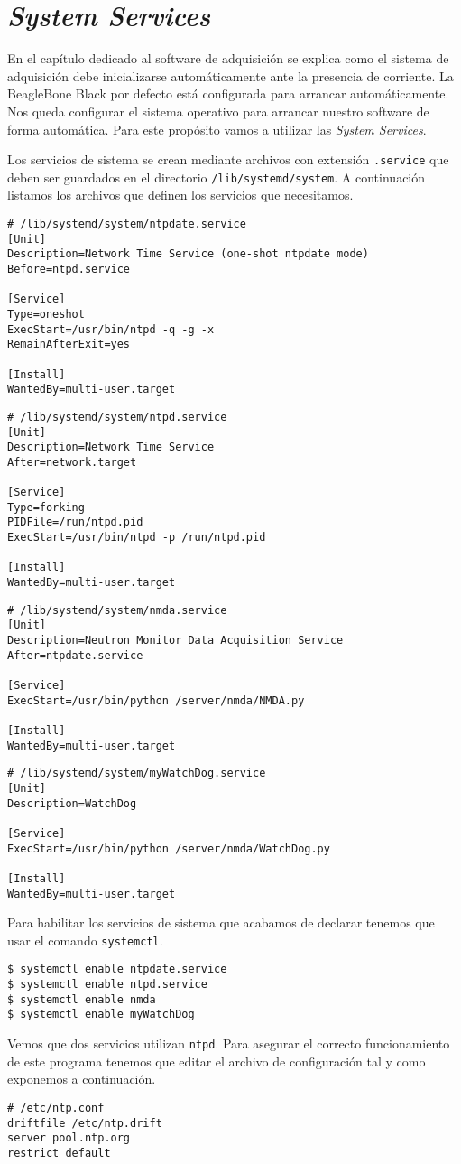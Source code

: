 	\section{\emph{System Services}}
		\label{appendix:systemctl}
		En el capítulo dedicado al software de adquisición se explica como el sistema de adquisición debe inicializarse automáticamente ante
		la presencia de corriente. La BeagleBone Black por defecto está configurada para arrancar automáticamente. Nos queda configurar el
		sistema operativo para arrancar nuestro software de forma automática. Para este propósito vamos a utilizar las \emph{System Services}. 
		\par
		Los servicios de sistema se crean mediante archivos con extensión \texttt{.service} que deben ser guardados en el directorio
		\texttt{/lib/systemd/system}. A continuación listamos los archivos que definen los servicios que necesitamos.
		\begin{lstlisting}[style=myFile]
# /lib/systemd/system/ntpdate.service
[Unit]
Description=Network Time Service (one-shot ntpdate mode)
Before=ntpd.service

[Service]
Type=oneshot
ExecStart=/usr/bin/ntpd -q -g -x
RemainAfterExit=yes

[Install]
WantedBy=multi-user.target
		\end{lstlisting}
		\begin{lstlisting}[style=myFile]
# /lib/systemd/system/ntpd.service
[Unit]
Description=Network Time Service
After=network.target

[Service]
Type=forking
PIDFile=/run/ntpd.pid
ExecStart=/usr/bin/ntpd -p /run/ntpd.pid

[Install]
WantedBy=multi-user.target
		\end{lstlisting}
		\begin{lstlisting}[style=myFile]
# /lib/systemd/system/nmda.service
[Unit]
Description=Neutron Monitor Data Acquisition Service
After=ntpdate.service

[Service]
ExecStart=/usr/bin/python /server/nmda/NMDA.py

[Install]
WantedBy=multi-user.target
		\end{lstlisting}
		\begin{lstlisting}[style=myFile]
# /lib/systemd/system/myWatchDog.service         
[Unit]
Description=WatchDog

[Service]
ExecStart=/usr/bin/python /server/nmda/WatchDog.py

[Install]
WantedBy=multi-user.target
		\end{lstlisting}
		Para habilitar los servicios de sistema que acabamos de declarar tenemos que usar el comando \texttt{systemctl}.
		\begin{lstlisting}[style=myBash]
$ systemctl enable ntpdate.service
$ systemctl enable ntpd.service
$ systemctl enable nmda
$ systemctl enable myWatchDog
		\end{lstlisting}
		Vemos que dos servicios utilizan \texttt{ntpd}. Para asegurar el correcto funcionamiento de este programa tenemos que editar el
		archivo de configuración tal y como exponemos a continuación.
		\begin{lstlisting}[style=myFile]
# /etc/ntp.conf
driftfile /etc/ntp.drift
server pool.ntp.org
restrict default
		\end{lstlisting}
